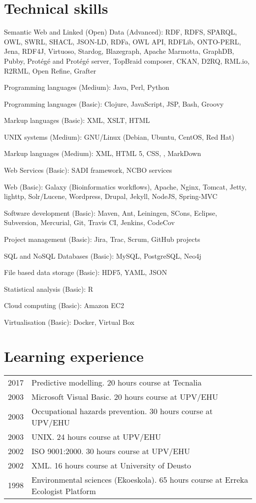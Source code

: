 \documentclass[11pt,fullpage]{article}
\renewenvironment{itemize}{
  \begin{list}{}{
    \setlength{\leftmargin}{1.5em}
  }
}{
  \end{list}
}
\begin{document}
\section*{Technical skills}
\begin{itemize}
	\item Semantic Web and Linked (Open) Data (Advanced): RDF, RDFS, SPARQL, OWL, SWRL, SHACL, JSON-LD, RDFa, OWL API, RDFLib, ONTO-PERL, Jena, RDF4J, Virtuoso, Stardog, Blazegraph, Apache Marmotta, GraphDB, Pubby, Prot\'eg\'e and Prot\'eg\'e server, TopBraid composer, CKAN, D2RQ, RML.io, R2RML, Open Refine, Grafter
	\item Programming languages (Medium): Java, Perl, Python
	\item Programming languages (Basic): Clojure, JavaScript, JSP, Bash, Groovy
  \item Markup languages (Basic): XML, XSLT, HTML
	\item UNIX systems (Medium): GNU/Linux (Debian, Ubuntu, CentOS, Red Hat)
	\item Markup languages (Medium): XML, HTML 5, CSS, \LaTeXe, MarkDown
	\item Web Services (Basic): SADI framework, NCBO services
	\item Web (Basic): Galaxy (Bioinformatics workflows), Apache, Nginx, Tomcat, Jetty, lighttp, Solr/Lucene, Wordpress, Drupal, Jekyll, NodeJS, Spring-MVC
	\item Software development (Basic): Maven, Ant, Leiningen, SCons, Eclipse, Subversion, Mercurial, Git, Travis CI, Jenkins, CodeCov
	\item Project management (Basic): Jira, Trac, Scrum, GitHub projects
	\item SQL and NoSQL Databases (Basic): MySQL, PostgreSQL, Neo4j
	\item File based data storage (Basic): HDF5, YAML, JSON
	\item Statistical analysis (Basic): R
	\item Cloud computing (Basic): Amazon EC2
	\item Virtualisation (Basic): Docker, Virtual Box
\end{itemize}

\section*{Learning experience}
\begin{longtable}{p{0.5in}|p{5.5in}}
2017 & Predictive modelling. 20 hours course at Tecnalia \\
2003 & Microsoft Visual Basic. 20 hours course at UPV/EHU \\
2003 & Occupational hazards prevention.  30 hours course at UPV/EHU \\
2003 & UNIX. 24 hours course at UPV/EHU \\
2002 & ISO 9001:2000. 30 hours course at UPV/EHU \\
2002 & XML. 16 hours course at University of Deusto \\
1998 & Environmental sciences (Ekoeskola). 65 hours course at Erreka Ecologist Platform \\
\end{longtable}
\end{document}
